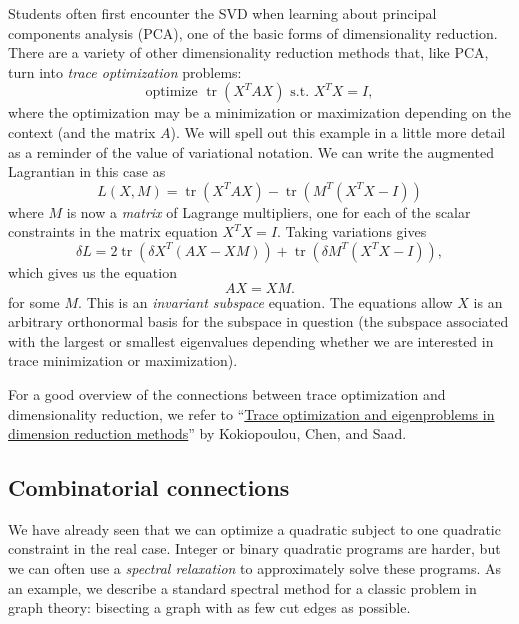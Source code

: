 \documentclass[12pt, leqno]{article} %
\begin{document}
Students often first encounter the SVD when learning about principal
components analysis (PCA), one of the basic forms of dimensionality
reduction.  There are a variety of other dimensionality reduction
methods that, like PCA, turn into {\em trace optimization} problems:
\[
  \mbox{optimize } \operatorname{tr}(X^T A X) \mbox{ s.t.~} X^T X = I,
\]
where the optimization may be a minimization or maximization depending
on the context (and the matrix $A$).  We will spell out this example
in a little more detail as a reminder of the value of variational
notation.  We can write the augmented Lagrantian in this case as
\[
  L(X,M) = 
  \operatorname{tr}(X^T A X) - \operatorname{tr}(M^T (X^T X-I))
\]
where $M$ is now a {\em matrix} of Lagrange multipliers, one for each
of the scalar constraints in the matrix equation $X^TX = I$.  Taking
variations gives
\[
\delta L =
2 \operatorname{tr}(\delta X^T (AX-XM)) +
\operatorname{tr} (\delta M^T (X^TX-I)),
\]
which gives us the equation
\[
  AX = XM.
\]
for some $M$.  This is an {\em invariant subspace} equation.  The
equations allow $X$ is an arbitrary orthonormal basis for the subspace
in question (the subspace associated with the largest or smallest
eigenvalues depending whether we are interested in trace minimization
or maximization).

For a good overview of the connections between trace optimization and
dimensionality reduction, we refer to
``\href{http://www-users.cs.umn.edu/~saad/PDF/umsi-2009-31.pdf}{Trace
  optimization and eigenproblems in dimension reduction methods}'' by
Kokiopoulou, Chen, and Saad.

\subsection*{Combinatorial connections}

We have already seen that we can optimize a quadratic subject to one
quadratic constraint in the real case.  Integer or binary quadratic
programs are harder, but we can often use a {\em spectral relaxation}
to approximately solve these programs.  As an example, we describe
a standard spectral method for a classic problem in graph theory:
bisecting a graph with as few cut edges as possible.
\end{document}
